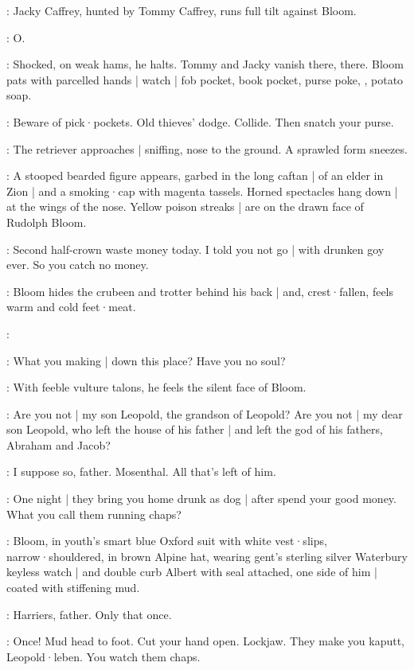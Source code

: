 :
Jacky Caffrey,
hunted by Tommy Caffrey,
runs full tilt against Bloom.

\Bloom:
O.

:
Shocked,
on weak hams,
he halts.
Tommy and Jacky vanish there,
there.
Bloom pats with parcelled hands |
watch |
fob pocket,
book pocket,
purse poke,
,
potato soap.

\Bloom:
Beware of pick·pockets.
Old thieves' dodge.
Collide.
Then snatch your purse.

:
The retriever approaches |
sniffing,
nose to the ground.
A sprawled form sneezes.

:
A stooped bearded figure appears,
garbed in the long caftan |
of an elder in Zion |
and a smoking·cap with magenta tassels.
Horned spectacles hang down |
at the wings of the nose.
Yellow poison streaks |
are on the drawn face of Rudolph Bloom.

\Rudolph:
Second half-crown waste money today.
I told you not go |
with drunken goy ever.
So you catch no money.

:
Bloom hides the crubeen and trotter behind his back |
and,
crest·fallen,
feels warm and cold feet·meat.

\Bloom:

\Rudolph:
What you making |
down this place?
Have you no soul?

:
With feeble vulture talons,
he feels the silent face of Bloom.

\Rudolph:
Are you not |
my son Leopold,
the grandson of Leopold?
Are you not |
my dear son Leopold,
who left the house of his father |
and left the god of his fathers,
Abraham and Jacob?

\Bloom:
I suppose so,
father.
Mosenthal.
All that's left of him.

\Rudolph:
One night |
they bring you home drunk as dog |
after spend your good money.
What you call them running chaps?

:
Bloom,
in youth's smart blue Oxford suit with white vest·slips,
narrow·shouldered,
in brown Alpine hat,
wearing gent's sterling silver Waterbury keyless watch |
and double curb Albert with seal attached,
one side of him |
coated with stiffening mud.

\Bloom:
Harriers,
father.
Only that once.

\Rudolph:
Once!
Mud head to foot.
Cut your hand open.
Lockjaw.
They make you kaputt,
Leopold·leben.
You watch them chaps.

